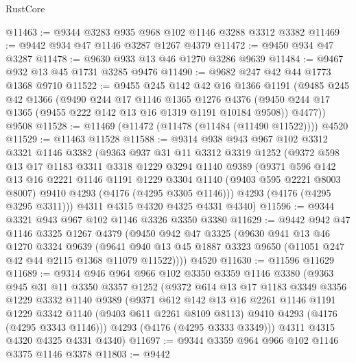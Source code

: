 \begin{lexlean}{RustCore}
\begin{coremodule}
@11463 := @9344 @3283 @935 @968 @102 @1146 @3288 @3312 @3382
@11469 := @9442 @934 @47 @1146 @3287 @1267 @4379
@11472 := @9450 @934 @47 @3287
@11478 := @9630 @933 @13 @46 @1270 @3286 @9639
@11484 := @9467 @932 @13 @45 @1731 @3285 @9476
@11490 := @9682 @247 @42 @44 @1773 @1368 @9710
@11522 := @9455
    @245
    @142
    @42
    @16
    @1366
    @1191
    (@9485
      @245
      @42
      @1366
      (@9490
        @244
        @17
        @1146
        @1365
        @1276
        @4376
        (@9450 @244 @17 @1365 (@9455 @222 @142 @13 @16 @1319 @1191 @10184 @9508))
        @4477))
    @9508
@11528 := @11469 (@11472 (@11478 (@11484 (@11490 @11522)))) @4520
@11529 := @11463 @11528
@11588 := @9314
    @938
    @943
    @967
    @102
    @3312
    @3321
    @1146
    @3382
    (@9363
      @937
      @31
      @11
      @3312
      @3319
      @1252
      (@9372
        @598
        @13
        @17
        @1183
        @3311
        @3318
        @1229
        @3294
        @1140
        @9389
        (@9371
          @596
          @142
          @13
          @16
          @2221
          @1146
          @1191
          @1229
          @3304
          @1140
          (@9403 @595 @2221 @8003 @8007)
          @9410
          @4293
          (@4176 (@4295 @3305 @1146)))
        @4293
        (@4176 (@4295 @3295 @3311)))
      @4311
      @4315
      @4320
      @4325
      @4331
      @4340)
@11596 := @9344 @3321 @943 @967 @102 @1146 @3326 @3350 @3380
@11629 := @9442
    @942
    @47
    @1146
    @3325
    @1267
    @4379
    (@9450
      @942
      @47
      @3325
      (@9630
        @941
        @13
        @46
        @1270
        @3324
        @9639
        (@9641 @940 @13 @45 @1887 @3323 @9650 (@11051 @247 @42 @44 @2115 @1368 @11079 @11522))))
    @4520
@11630 := @11596 @11629
@11689 := @9314
    @946
    @964
    @966
    @102
    @3350
    @3359
    @1146
    @3380
    (@9363
      @945
      @31
      @11
      @3350
      @3357
      @1252
      (@9372
        @614
        @13
        @17
        @1183
        @3349
        @3356
        @1229
        @3332
        @1140
        @9389
        (@9371
          @612
          @142
          @13
          @16
          @2261
          @1146
          @1191
          @1229
          @3342
          @1140
          (@9403 @611 @2261 @8109 @8113)
          @9410
          @4293
          (@4176 (@4295 @3343 @1146)))
        @4293
        (@4176 (@4295 @3333 @3349)))
      @4311
      @4315
      @4320
      @4325
      @4331
      @4340)
@11697 := @9344 @3359 @964 @966 @102 @1146 @3375 @1146 @3378
@11803 := @9442

\end{coremodule}
\end{lexlean}
